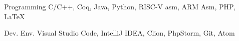 

\begin{cvskills}

	\cvskill
	{Programming} %
	{C/C++, Coq, Java, Python, RISC-V asm, ARM Asm, PHP, \LaTeX} %

	\cvskill
	{Dev. Env.} %
	{Visual Studio Code, IntelliJ IDEA, Clion, PhpStorm, Git, Atom} %

\end{cvskills}
